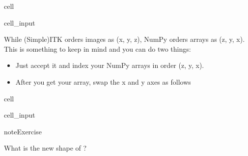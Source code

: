 \documentclass[letterpaper,10pt,english]{jupyterBook}
\begin{document}
\begin{sphinxuseclass}{cell}\begin{sphinxVerbatimInput}

\begin{sphinxuseclass}{cell_input}
\begin{sphinxVerbatim}[commandchars=\\\{\}]
\end{sphinxVerbatim}

\end{sphinxuseclass}\end{sphinxVerbatimInput}

\end{sphinxuseclass}
\sphinxAtStartPar
While (Simple)ITK orders images as (x, y, z), NumPy orders arrays as (z, y, x). This is something to keep in mind and you can do two things:
\begin{itemize}
\item {} 
\sphinxAtStartPar
Just accept it and index your NumPy arrays in order (z, y, x).

\item {} 
\sphinxAtStartPar
After you get your array, swap the x and y axes as follows

\end{itemize}

\begin{sphinxuseclass}{cell}\begin{sphinxVerbatimInput}

\begin{sphinxuseclass}{cell_input}
\begin{sphinxVerbatim}[commandchars=\\\{\}]
    
\end{sphinxVerbatim}

\end{sphinxuseclass}\end{sphinxVerbatimInput}

\end{sphinxuseclass}
\begin{sphinxadmonition}{note}{Exercise}

\sphinxAtStartPar
What is the new shape of ?
\end{sphinxadmonition}
\end{document}
